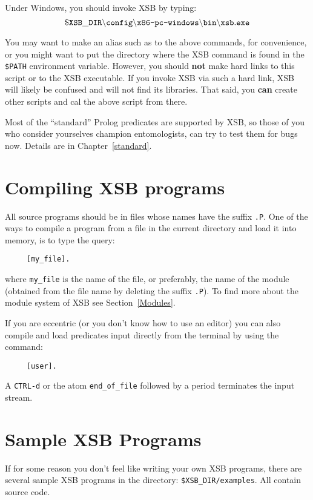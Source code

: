 Under Windows, you should invoke XSB by typing:
\[
 \tt
 \$XSB\_DIR\backslash config\backslash \mbox{\tt x86-pc-windows}\backslash bin
 \backslash xsb.exe
\]


You may want to make an alias such as {\tt \smallourprolog} to the above
commands, for convenience, or you might want to put the directory where the
XSB command is found in the {\tt \$PATH} environment variable. However, you
should {\bf not} make hard links to this script or to the XSB executable.
If you invoke XSB via such a hard link, XSB will likely be confused and will
not find its libraries.  That said, you {\bf can} create other scripts and
cal the above script from there.

Most of the ``standard'' Prolog predicates are supported by XSB, 
so those of you who consider yourselves champion entomologists, can try
to test them for bugs now.  Details are in Chapter~\ref{standard}.


\section{Compiling XSB programs}

All source programs should be in files whose names have the 
suffix {\tt .P}.  One of the ways to compile a program from a file in 
the current directory and load it into memory, is to type the query:
\begin{verbatim}
     [my_file].
\end{verbatim}
where \verb'my_file' is the name of the file, or preferably, the name
of the module (obtained from the file name by deleting the suffix {\tt .P}).
To find more about the module system of XSB see Section~\ref{Modules}.

If you are eccentric (or you don't know how to use an editor) you can also 
compile and load predicates input directly from the terminal by using the
command:
\begin{verbatim}
     [user].
\end{verbatim}
A {\tt CTRL-d} or the atom \verb'end_of_file' followed by a period 
terminates the input stream.


\section{Sample XSB Programs}

If for some reason you don't feel like writing your own XSB programs, 
there are several sample XSB programs in the directory: 
{\tt \$XSB\_DIR/examples}.  All contain source code.

